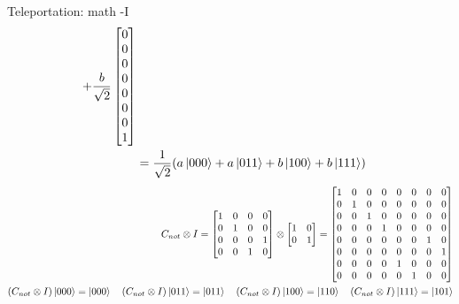 \documentclass{beamer}
\begin{document}
\begin{frame}{Teleportation: math -I}
{\begin{align*}
      +
      \frac{b}{\sqrt{2}} \begin{bmatrix} 0 \\ 0 \\ 0 \\ 0 \\ 0 \\ 0 \\ 0 \\ 1 \end{bmatrix}  \\
      &= \frac{1}{\sqrt{2}} ( a\ket{000} + a\ket{011} + b\ket{100} + b\ket{111})
    \end{align*}
    \begin{align*}
      C_{not} \otimes I =
      \begin{bmatrix}
        1  & 0 & 0 & 0 \\
        0  & 1 & 0 & 0 \\
        0  & 0 & 0 & 1 \\
        0  & 0 & 1 & 0 \\
      \end{bmatrix} 
      \otimes
      \begin{bmatrix}
        1 & 0 \\
        0 & 1 \\
      \end{bmatrix} 
      =
      \begin{bmatrix} 
        1 & 0 & 0 & 0 & 0 & 0 & 0 & 0 \\
        0 & 1 & 0 & 0 & 0 & 0 & 0 & 0 \\
        0 & 0 & 1 & 0 & 0 & 0 & 0 & 0 \\
        0 & 0 & 0 & 1 & 0 & 0 & 0 & 0 \\
        0 & 0 & 0 & 0 & 0 & 0 & 1 & 0 \\
        0 & 0 & 0 & 0 & 0 & 0 & 0 & 1 \\
        0 & 0 & 0 & 0 & 1 & 0 & 0 & 0 \\
        0 & 0 & 0 & 0 & 0 & 1 & 0 & 0 \\
      \end{bmatrix}  \\
      (C_{not} \otimes I) \ket{000} = \ket{000}
      \quad
      (C_{not} \otimes I) \ket{011} = \ket{011}
      \quad
      (C_{not} \otimes I) \ket{100} = \ket{110}
      \quad
      (C_{not} \otimes I) \ket{111} = \ket{101}
    \end{align*}
    }%
\end{frame}
\end{document}
